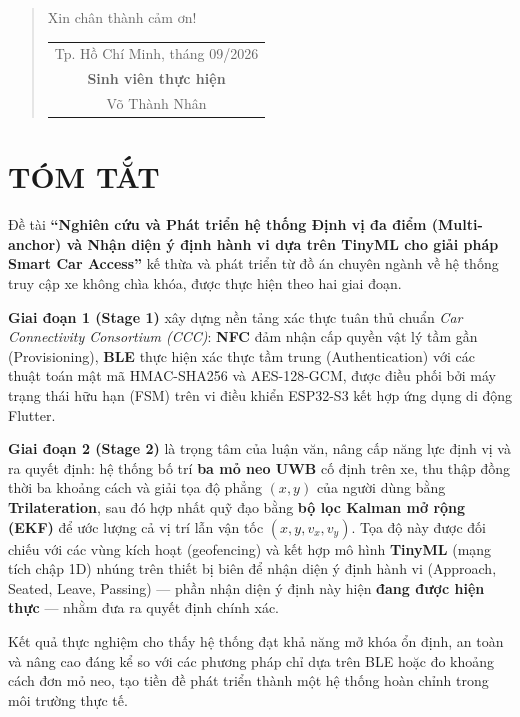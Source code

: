 \documentclass[a4paper,12pt,twoside]{report}
\begin{document}
\begin{quotation}
\singlespacing
Xin chân thành cảm ơn!

\begin{flushright}
\begin{tabular}{c}
Tp. Hồ Chí Minh, tháng 09/2026\\
\textbf{Sinh viên thực hiện}\\
Võ Thành Nhân
\end{tabular}
\end{flushright}

\end{quotation}



\clearpage
{}
{}
\section*{\MakeUppercase{TÓM TẮT}}

Đề tài \textbf{``Nghiên cứu và Phát triển hệ thống Định vị đa điểm (Multi-anchor) và Nhận diện ý định hành vi dựa trên TinyML cho giải pháp Smart Car Access''} kế thừa và phát triển từ đồ án chuyên ngành về hệ thống truy cập xe không chìa khóa, được thực hiện theo hai giai đoạn.

\textbf{Giai đoạn 1 (Stage 1)} xây dựng nền tảng xác thực tuân thủ chuẩn \textit{Car Connectivity Consortium (CCC)}: \textbf{NFC} đảm nhận cấp quyền vật lý tầm gần (Provisioning), \textbf{BLE} thực hiện xác thực tầm trung (Authentication) với các thuật toán mật mã HMAC-SHA256 và AES-128-GCM, được điều phối bởi máy trạng thái hữu hạn (FSM) trên vi điều khiển ESP32-S3 kết hợp ứng dụng di động Flutter.

\textbf{Giai đoạn 2 (Stage 2)} là trọng tâm của luận văn, nâng cấp năng lực định vị và ra quyết định: hệ thống bố trí \textbf{ba mỏ neo UWB} cố định trên xe, thu thập đồng thời ba khoảng cách và giải tọa độ phẳng $(x, y)$ của người dùng bằng \textbf{Trilateration}, sau đó hợp nhất quỹ đạo bằng \textbf{bộ lọc Kalman mở rộng (EKF)} để ước lượng cả vị trí lẫn vận tốc $(x, y, v_x, v_y)$. Tọa độ này được đối chiếu với các vùng kích hoạt (geofencing) và kết hợp mô hình \textbf{TinyML} (mạng tích chập 1D) nhúng trên thiết bị biên để nhận diện ý định hành vi (Approach, Seated, Leave, Passing) --- phần nhận diện ý định này hiện \textbf{đang được hiện thực} --- nhằm đưa ra quyết định chính xác.

Kết quả thực nghiệm cho thấy hệ thống đạt khả năng mở khóa ổn định, an toàn và nâng cao đáng kể so với các phương pháp chỉ dựa trên BLE hoặc đo khoảng cách đơn mỏ neo, tạo tiền đề phát triển thành một hệ thống hoàn chỉnh trong môi trường thực tế.
\end{document}
